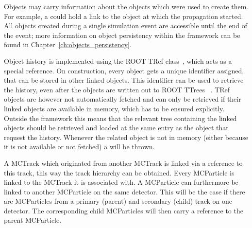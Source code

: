 Objects may carry information about the objects which were used to create them.
For example, a  could hold a link to the  object at which the propagation started.
All objects created during a single simulation event are accessible until the end of the event; more information on object persistency within the framework can be found in Chapter~\ref{ch:objects_persistency}.

Object history is implemented using the ROOT TRef class~\cite{roottref}, which acts as a special reference.
On construction, every object gets a unique identifier assigned, that can be stored in other linked objects.
This identifier can be used to retrieve the history, even after the objects are written out to ROOT TTrees ~\cite{roottree}.
TRef objects are however not automatically fetched and can only be retrieved if their linked objects are available in memory, which has to be ensured explicitly.
Outside the framework this means that the relevant tree containing the linked objects should be retrieved and loaded at the same entry as the object that request the history.
Whenever the related object is not in memory (either because it is not available or not fetched) a  will be thrown.

A MCTrack which originated from another MCTrack is linked via a reference to this track, this way the track hierarchy can be obtained.
Every MCParticle is linked to the MCTrack it is associated with.
A MCParticle can furthermore be linked to another MCParticle on the same detector.
This will be the case if there are MCParticles from a primary (parent) and secondary (child) track on one detector.
The corresponding child MCParticles will then carry a reference to the parent MCParticle.
